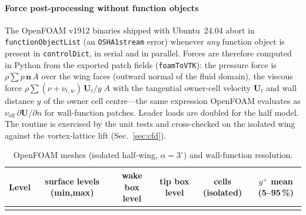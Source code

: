 \paragraph{Force post-processing without function objects} The OpenFOAM v1912 binaries shipped with Ubuntu~24.04 abort in \texttt{functionObjectList} (an \texttt{OSHA1stream} error) whenever \emph{any} function object is present in \texttt{controlDict}, in serial and in parallel. Forces are therefore computed in Python from the exported patch fields (\texttt{foamToVTK}): the pressure force is $\rho\sum p\,\mathbf{n}\,A$ over the wing faces (outward normal of the fluid domain), the viscous force $\rho\sum(\nu+\nu_{t,w})\,\mathbf{U}_t/y\;A$ with the tangential owner-cell velocity $\mathbf U_t$ and wall distance $y$ of the owner cell centre---the same expression OpenFOAM evaluates as $\nu_{\mathrm{eff}}\,\partial\mathbf{U}/\partial n$ for wall-function patches. Leader loads are doubled for the half model. The routine is exercised by the unit tests and cross-checked on the isolated wing against the vortex-lattice lift (Sec.~\ref{sec:cfd}).
\begin{table}[H]\centering\small
\caption{OpenFOAM meshes (isolated half-wing, $\alpha=3^\circ$) and wall-function resolution.}\label{tab:cfdmesh}
\begin{tabular}{@{}lccccc@{}}\toprule
Level & surface levels (min,max) & wake box level & tip box level & cells (isolated) & $y^+$ mean (5--95\,\%)\\\midrule
\\\bottomrule
\end{tabular}\end{table}
